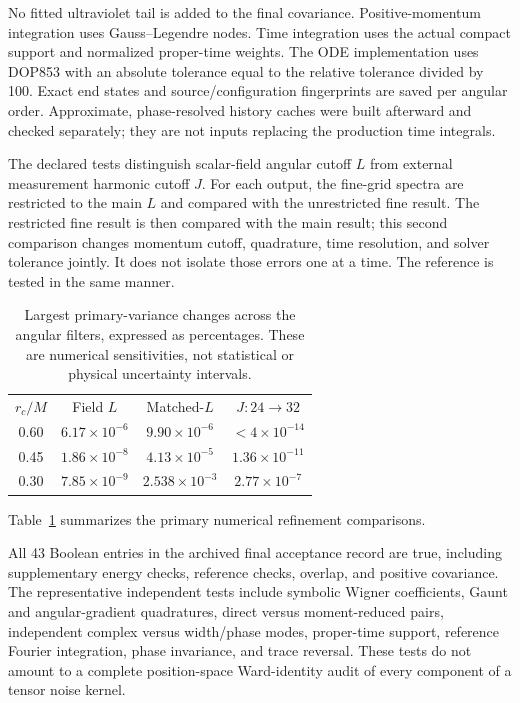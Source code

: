 \documentclass[aps,prd,reprint,floatfix,nofootinbib,longbibliography]{revtex4-2}
\begin{document}
No fitted ultraviolet tail is added to the final covariance. Positive-momentum integration uses Gauss--Legendre nodes. Time integration uses the actual compact support and normalized proper-time weights. The ODE implementation uses DOP853 with an absolute tolerance equal to the relative tolerance divided by 100. Exact end states and source/configuration fingerprints are saved per angular order. Approximate, phase-resolved history caches were built afterward and checked separately; they are not inputs replacing the production time integrals.

The declared tests distinguish scalar-field angular cutoff $L$ from external measurement harmonic cutoff $J$. For each output, the fine-grid spectra are restricted to the main $L$ and compared with the unrestricted fine result. The restricted fine result is then compared with the main result; this second comparison changes momentum cutoff, quadrature, time resolution, and solver tolerance jointly. It does not isolate those errors one at a time. The reference is tested in the same manner.

\begin{table}[tb]
\caption{Largest primary-variance changes across the angular filters, expressed as percentages. These are numerical sensitivities, not statistical or physical uncertainty intervals.}
\label{tab:errors}
\begin{ruledtabular}
\begin{tabular}{cccc}
$r_c/M$&Field $L$&Matched-$L$&$J:24\to32$\\
0.60&$6.17\times10^{-6}$&$9.90\times10^{-6}$&$<4\times10^{-14}$\\
0.45&$1.86\times10^{-8}$&$4.13\times10^{-5}$&$1.36\times10^{-11}$\\
0.30&$7.85\times10^{-9}$&$2.538\times10^{-3}$&$2.77\times10^{-7}$
\end{tabular}
\end{ruledtabular}
\end{table}

Table~\ref{tab:errors} summarizes the primary numerical refinement comparisons.

All 43 Boolean entries in the archived final acceptance record are true, including supplementary energy checks, reference checks, overlap, and positive covariance. The representative independent tests include symbolic Wigner coefficients, Gaunt and angular-gradient quadratures, direct versus moment-reduced pairs, independent complex versus width/phase modes, proper-time support, reference Fourier integration, phase invariance, and trace reversal. These tests do not amount to a complete position-space Ward-identity audit of every component of a tensor noise kernel.
\end{document}
